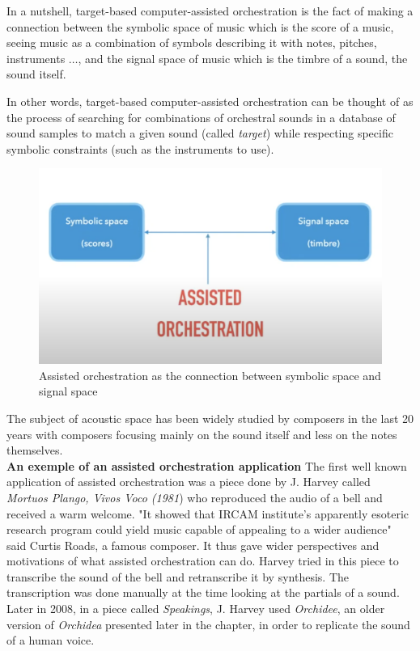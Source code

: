 \documentclass[a4paper]{book}
\begin{document}
In a nutshell, target-based computer-assisted orchestration is the fact of making a connection between the symbolic space of music which is the score of a music, seeing music as a combination of symbols describing it with notes, pitches, instruments $\ldots$, and the signal space of music which is the timbre of a sound, the sound itself. 

In other words, target-based computer-assisted orchestration can be thought of as the process of searching for combinations of orchestral sounds in a database of sound samples to match a given sound (called \emph{target}) while respecting specific symbolic constraints (such as the instruments to use).
\begin{figure}[h!]
\centering
\includegraphics[scale=0.4]{assistedorch.png}
\caption{Assisted orchestration as the connection between symbolic space and signal space}
\label{figassistedorch}
\end{figure}

The subject of acoustic space has been widely studied by composers in the last 20 years with composers focusing mainly on the sound itself and less on the notes themselves.  \\

\textbf{An exemple of an assisted orchestration application }
The first well known application of assisted orchestration was a piece done by J. Harvey called \textit{Mortuos Plango, Vivos Voco (1981}) who reproduced the audio of a bell and received a warm welcome. "It showed that IRCAM institute's apparently esoteric research program could yield music capable of appealing to a wider audience" said Curtis Roads, a famous composer. It thus gave wider perspectives and motivations of what assisted orchestration can do. Harvey tried in this piece to transcribe the sound of the bell and retranscribe it by synthesis. The transcription was done manually at the time looking at the partials of a sound.\\
Later in 2008, in a piece called \textit{Speakings}, J. Harvey used \textit{Orchidee}, an older version of \textit{Orchidea} presented later in the chapter, in order to replicate the sound of a human voice.\\
\end{document}
